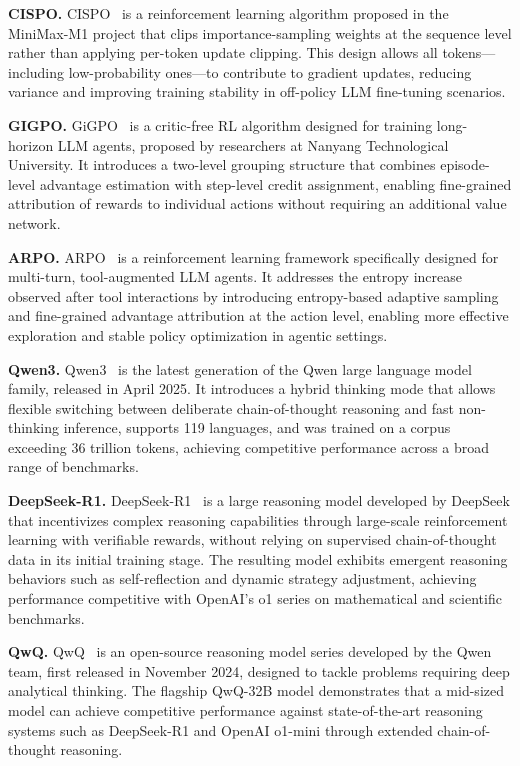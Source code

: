 \documentclass{llmxive}
\begin{document}
\noindent\textbf{CISPO.} CISPO~\cite{chen2025minimax} is a reinforcement learning algorithm proposed in the MiniMax-M1 project that clips importance-sampling weights at the sequence level rather than applying per-token update clipping. This design allows all tokens—including low-probability ones—to contribute to gradient updates, reducing variance and improving training stability in off-policy LLM fine-tuning scenarios.

\noindent\textbf{GIGPO.} GiGPO~\cite{feng2025group} is a critic-free RL algorithm designed for training long-horizon LLM agents, proposed by researchers at Nanyang Technological University. It introduces a two-level grouping structure that combines episode-level advantage estimation with step-level credit assignment, enabling fine-grained attribution of rewards to individual actions without requiring an additional value network.
 

\noindent\textbf{ARPO.} ARPO~\cite{dong2025agentic} is a reinforcement learning framework specifically designed for multi-turn, tool-augmented LLM agents. It addresses the entropy increase observed after tool interactions by introducing entropy-based adaptive sampling and fine-grained advantage attribution at the action level, enabling more effective exploration and stable policy optimization in agentic settings.

\noindent\textbf{Qwen3.} Qwen3~\cite{yang2025qwen3} is the latest generation of the Qwen large language model family, released in April 2025. It introduces a hybrid thinking mode that allows flexible switching between deliberate chain-of-thought reasoning and fast non-thinking inference, supports 119 languages, and was trained on a corpus exceeding 36 trillion tokens, achieving competitive performance across a broad range of benchmarks.

\noindent\textbf{DeepSeek-R1.} DeepSeek-R1~\cite{guo2025deepseek} is a large reasoning model developed by DeepSeek that incentivizes complex reasoning capabilities through large-scale reinforcement learning with verifiable rewards, without relying on supervised chain-of-thought data in its initial training stage. The resulting model exhibits emergent reasoning behaviors such as self-reflection and dynamic strategy adjustment, achieving performance competitive with OpenAI's o1 series on mathematical and scientific benchmarks.

\noindent\textbf{QwQ.} QwQ~\cite{team2024qwq} is an open-source reasoning model series developed by the Qwen team, first released in November 2024, designed to tackle problems requiring deep analytical thinking. The flagship QwQ-32B model demonstrates that a mid-sized model can achieve competitive performance against state-of-the-art reasoning systems such as DeepSeek-R1 and OpenAI o1-mini through extended chain-of-thought reasoning.
\end{document}
